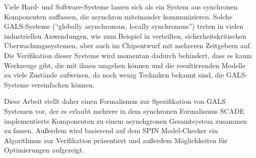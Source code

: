 Viele Hard- und Software-Systeme lassen sich als ein System aus synchronen Komponenten auffassen, die asynchron miteinander kommunizieren.
Solche GALS-Systeme ("`globally asynchronous, locally synchronous"') treten in vielen industriellen Anwendungen, wie zum Beispiel in verteilten, sicherheitskritischen Überwachungssystemen, aber auch im Chipentwurf mit mehreren Zeitgebern auf.
Die Verifikation dieser Systeme wird momentan dadurch behindert, dass es kaum Werkzeuge gibt, die mit ihnen umgehen können und die resultierenden Modelle zu viele Zustände aufweisen, da noch wenig Techniken bekannt sind, die GALS-Systeme vereinfachen können.

Diese Arbeit stellt daher einen Formalismus zur Spezifikation von GALS Systemen vor, der es erlaubt mehrere in dem synchronen Formalismus SCADE implementierte Komponenten zu einem asynchgronen Gesamtsystem zusammen zu fassen.
Außerdem wird basierend auf dem SPIN Model-Checker ein Algorithmus zur Verifikation präsentiert und außerdem Möglichkeiten für Optimierungen aufgezeigt.
